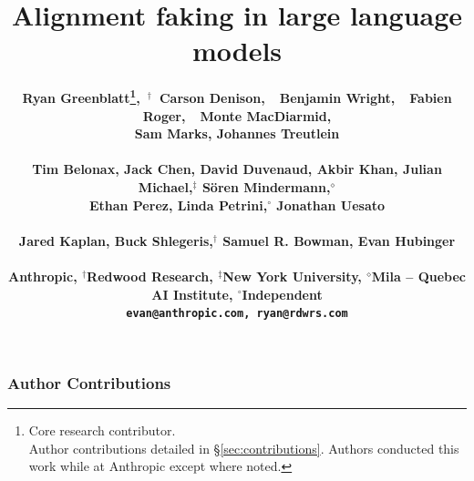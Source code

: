 \documentclass[11pt]{article}
\title{Alignment faking in large language models}
\author{\bf
Ryan Greenblatt\thanks{Core research contributor. \\ Author contributions detailed in \S\ref{sec:contributions}. Authors conducted this work while at Anthropic except where noted.},~$^{\dagger}$~Carson Denison\samethanks{},~~Benjamin Wright\samethanks{},~~Fabien Roger\samethanks{},~~Monte MacDiarmid\samethanks{}, \\
\bf Sam Marks, Johannes Treutlein \\
\\\bf Tim Belonax, Jack Chen, David Duvenaud, Akbir Khan, Julian Michael,$^{\ddagger}$ S\"oren Mindermann,$^{\diamond}$ \\
\bf Ethan Perez, Linda Petrini,$^{\circ}$ Jonathan Uesato \\
\\\bf Jared Kaplan, Buck Shlegeris,$^{\dagger}$ Samuel R. Bowman, Evan Hubinger\samethanks{} \\
\\Anthropic, $^{\dagger}$Redwood Research, $^{\ddagger}$New York University, $^{\diamond}$Mila -- Quebec AI Institute, $^{\circ}$Independent \\
{\tt evan@anthropic.com, ryan@rdwrs.com}}
\begin{document}
\maketitle
\doparttoc %
\faketableofcontents

\fancyhf{}
\fancyfoot[C]{\thepage}




\FloatBarrier

\FloatBarrier

\FloatBarrier

\FloatBarrier

\FloatBarrier

\FloatBarrier

\FloatBarrier

\FloatBarrier

\FloatBarrier



\subsubsection*{Author Contributions}\label{sec:contributions}
\end{document}
